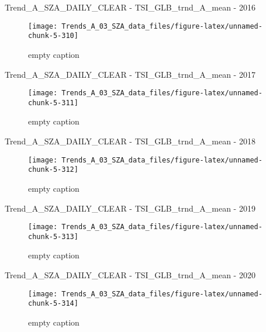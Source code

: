 \documentclass[
  10pt,
  a4paper,oneside]{article}
\begin{document}
Trend\_A\_SZA\_DAILY\_CLEAR - TSI\_GLB\_trnd\_A\_mean - 2016

\begin{figure}[!ht]

{\centering \texttt{[image: Trends\_A\_03\_SZA\_data\_files/figure-latex/unnamed-chunk-5-310]} 

}

\caption{ empty caption }\label{fig:unnamed-chunk-5-310}
\end{figure}

Trend\_A\_SZA\_DAILY\_CLEAR - TSI\_GLB\_trnd\_A\_mean - 2017

\begin{figure}[!ht]

{\centering \texttt{[image: Trends\_A\_03\_SZA\_data\_files/figure-latex/unnamed-chunk-5-311]} 

}

\caption{ empty caption }\label{fig:unnamed-chunk-5-311}
\end{figure}

Trend\_A\_SZA\_DAILY\_CLEAR - TSI\_GLB\_trnd\_A\_mean - 2018

\begin{figure}[!ht]

{\centering \texttt{[image: Trends\_A\_03\_SZA\_data\_files/figure-latex/unnamed-chunk-5-312]} 

}

\caption{ empty caption }\label{fig:unnamed-chunk-5-312}
\end{figure}

Trend\_A\_SZA\_DAILY\_CLEAR - TSI\_GLB\_trnd\_A\_mean - 2019

\begin{figure}[!ht]

{\centering \texttt{[image: Trends\_A\_03\_SZA\_data\_files/figure-latex/unnamed-chunk-5-313]} 

}

\caption{ empty caption }\label{fig:unnamed-chunk-5-313}
\end{figure}

Trend\_A\_SZA\_DAILY\_CLEAR - TSI\_GLB\_trnd\_A\_mean - 2020

\begin{figure}[!ht]

{\centering \texttt{[image: Trends\_A\_03\_SZA\_data\_files/figure-latex/unnamed-chunk-5-314]} 

}

\caption{ empty caption }\label{fig:unnamed-chunk-5-314}
\end{figure}
\end{document}
